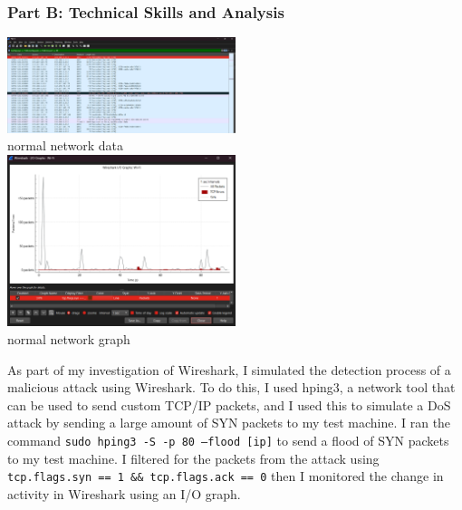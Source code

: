 \documentclass[a4paper, 11pt]{report}
\begin{document}
\subsubsection{Part B: Technical Skills and Analysis}

\begin{center}
	\includegraphics[width=0.5\textwidth]{wireshark1.png} \\
	normal network data \\

	\includegraphics[width=0.5\textwidth]{wireshark2.png} \\
	normal network graph \\

\end{center}

As part of my investigation of Wireshark, I simulated the detection process of a malicious attack using Wireshark. To do this, I used hping3, a network tool that can be used to send custom TCP/IP packets, and I used this to simulate a DoS attack by sending a large amount of SYN packets to my test machine. I ran the command \texttt{sudo hping3 -S -p 80 –flood [ip]} to send a flood of SYN packets to my test machine. I filtered for the packets from the attack using \texttt{tcp.flags.syn == 1 \&\& tcp.flags.ack == 0} then I monitored the change in activity in Wireshark using an I/O graph.
\end{document}
